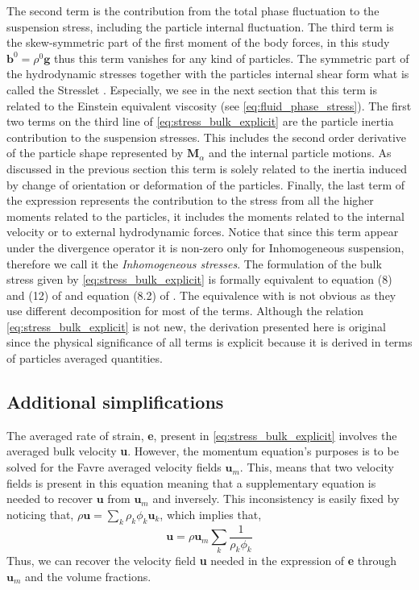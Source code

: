 The second term is the  contribution from the total phase fluctuation to the suspension stress, including the particle internal fluctuation. 
The third term is the skew-symmetric part of the first moment of the body forces, in this study $\textbf{b}^0 = \rho^0 \textbf{g}$ thus this term vanishes for any kind of particles. 
The symmetric part of the hydrodynamic stresses together with the particles internal shear form what is called the Stresslet \citep{pozrikidis1992boundary}. 
Especially, we see in the next section that this term is related to the Einstein equivalent viscosity (see \ref{eq:fluid_phase_stress}). 
The first two terms on the third line of \ref{eq:stress_bulk_explicit} are the particle inertia contribution to the suspension stresses. 
This includes the second order derivative of the particle shape represented by $\textbf{M}_\alpha$ and the internal particle motions. 
As discussed in the previous section this term is solely related to the inertia induced by change of orientation or deformation of the particles. 
Finally, the last term of the expression represents the contribution to the stress from all the higher moments related to the particles, it includes the moments related to the internal velocity or to external hydrodynamic forces.  
Notice that since this term appear under the divergence operator it is non-zero only for Inhomogeneous suspension, therefore we call it the \textit{Inhomogeneous stresses}. 
The formulation of the bulk stress given by \ref{eq:stress_bulk_explicit} is formally equivalent to equation (8) and (12) of \citet{lhuillier1996contribution} and equation (8.2) of \citet{zhang1997momentum}.
The equivalence with \citet{zhang1997momentum} is not obvious as they use different decomposition for most of the terms. 
Although the relation \ref{eq:stress_bulk_explicit} is not new, the derivation presented here is original since the physical significance of all terms is explicit because it is derived in terms of particles averaged quantities.

    
\subsection{Additional simplifications}

The averaged rate of strain, \textbf{e}, present in \ref{eq:stress_bulk_explicit} involves the averaged bulk velocity \textbf{u}. 
However, the momentum equation's purposes is to be solved for the Favre averaged velocity fields $\textbf{u}_m$. 
This, means that two velocity fields is present in this equation meaning that a supplementary equation is needed to recover $\textbf{u}$ from $\textbf{u}_m$ and inversely. 
This inconsistency is easily fixed by noticing that, $\rho \textbf{u} = \sum_k \rho_k \phi_k \textbf{u}_k$, which implies that, 
\begin{equation}
    \textbf{u}=\rho \textbf{u}_m\sum_k \frac{1}{\rho_k \phi_k}
\end{equation}
Thus, we can recover the velocity field \textbf{u} needed in the expression of \textbf{e} through $\textbf{u}_m$ and the volume fractions. 


